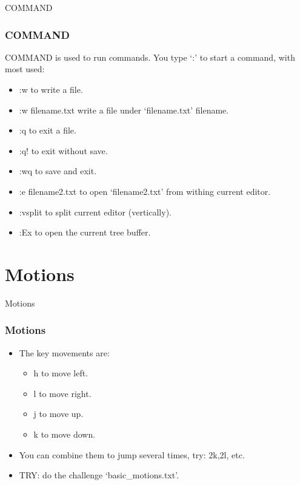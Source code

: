 \documentclass{beamer}
\begin{document}
\begin{frame}{COMMAND}
    \frametitle{COMMAND}
    COMMAND is used to run commands.
    You type `:' to start a command, with most used:
    \begin{itemize}
        \item \textsf{:w} to write a file.
        \item \textsf{:w filename.txt} write a file under `filename.txt' filename.
        \item \textsf{:q} to exit a file.
        \item \textsf{:q!} to exit without save.
        \item \textsf{:wq} to save and exit.
        \item \textsf{:e filename2.txt} to open `filename2.txt' from withing current editor.
        \item \textsf{:vsplit} to split current editor (vertically).
        \item \textsf{:Ex} to open the current tree buffer.
    \end{itemize}
\end{frame}

\section{Motions}
\begin{frame}{Motions}
    \frametitle{Motions}
    \begin{itemize}
        \item The key movements are:
            \begin{itemize}
                \item \textsf{h} to move left.
                \item \textsf{l} to move right.
                \item \textsf{j} to move up. 
                \item \textsf{k} to move down.
            \end{itemize}
        \item You can combine them to jump several times, try: \textsf{2k},\textsf{2l}, etc.
        \item TRY: do the challenge `basic\_motions.txt'.
    \end{itemize}
\end{frame}
\end{document}
